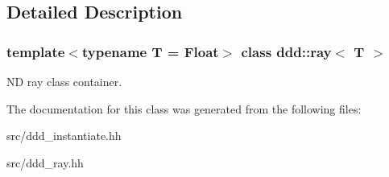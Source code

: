 \subsection{Detailed Description}
\subsubsection*{template$<$typename T = Float$>$\newline
class ddd\+::ray$<$ T $>$}

ND ray class container. 

The documentation for this class was generated from the following files\+:\begin{DoxyCompactItemize}
\item 
src/ddd\+\_\+instantiate.\+hh\item 
src/ddd\+\_\+ray.\+hh\end{DoxyCompactItemize}
